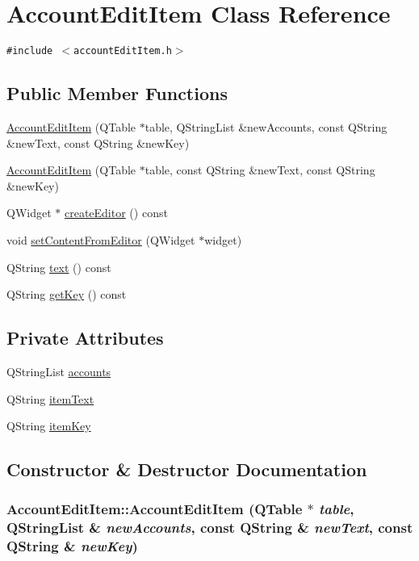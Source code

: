 \hypertarget{classAccountEditItem}{
\section{Account\-Edit\-Item Class Reference}
\label{classAccountEditItem}
}
{\tt \#include $<$account\-Edit\-Item.h$>$}

\subsection*{Public Member Functions}
\begin{CompactItemize}
\item 
\hyperlink{classAccountEditItem_a0}{Account\-Edit\-Item} (QTable $\ast$table, QString\-List \&new\-Accounts, const QString \&new\-Text, const QString \&new\-Key)
\item 
\hyperlink{classAccountEditItem_a1}{Account\-Edit\-Item} (QTable $\ast$table, const QString \&new\-Text, const QString \&new\-Key)
\item 
QWidget $\ast$ \hyperlink{classAccountEditItem_a2}{create\-Editor} () const
\item 
void \hyperlink{classAccountEditItem_a3}{set\-Content\-From\-Editor} (QWidget $\ast$widget)
\item 
QString \hyperlink{classAccountEditItem_a4}{text} () const
\item 
QString \hyperlink{classAccountEditItem_a5}{get\-Key} () const
\end{CompactItemize}
\subsection*{Private Attributes}
\begin{CompactItemize}
\item 
QString\-List \hyperlink{classAccountEditItem_r0}{accounts}
\item 
QString \hyperlink{classAccountEditItem_r1}{item\-Text}
\item 
QString \hyperlink{classAccountEditItem_r2}{item\-Key}
\end{CompactItemize}


\subsection{Constructor \& Destructor Documentation}
\hypertarget{classAccountEditItem_a0}{
\subsubsection[AccountEditItem]{\setlength{\rightskip}{0pt plus 5cm}Account\-Edit\-Item::Account\-Edit\-Item (QTable $\ast$ {\em table}, QString\-List \& {\em new\-Accounts}, const QString \& {\em new\-Text}, const QString \& {\em new\-Key})}}
\label{classAccountEditItem_a0}



